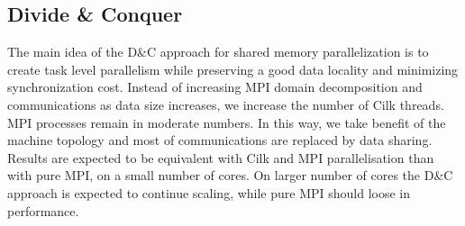 \documentclass{IOS-Book-Article}
\begin{document}
\subsection{Divide \& Conquer}


%
%



The main idea of the D\&C approach for shared memory parallelization is to create task level parallelism while preserving a good data locality and minimizing synchronization cost.
Instead of increasing MPI domain decomposition and communications as data size increases, we increase the number of Cilk threads. MPI processes remain in moderate numbers.
In this way, we take benefit of the machine topology and most of communications are replaced by data sharing.
Results are expected to be equivalent with Cilk and MPI parallelisation than with pure MPI, on a small number of cores.
On larger number of cores the D\&C approach is expected to continue scaling, while pure MPI should loose in performance.
\end{document}
